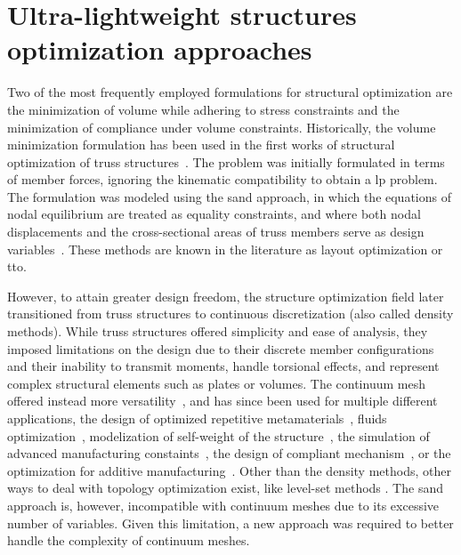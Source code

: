 \section{Ultra-lightweight structures optimization approaches}
Two of the most frequently employed formulations for structural optimization are the minimization of volume while adhering to stress constraints and the minimization of compliance under volume constraints. Historically, the volume minimization formulation has been used in the first works of structural optimization of truss structures~. The problem was initially formulated in terms of member forces, ignoring the kinematic compatibility to obtain a \gls{lp} problem. The formulation was modeled using the \gls{sand} approach, in which the equations of nodal equilibrium are treated as equality constraints, and where both nodal displacements and the cross-sectional areas of truss members serve as design variables~. These methods are known in the literature as layout optimization or \gls{tto}. 

However, to attain greater design freedom, the structure optimization field later transitioned from truss structures to continuous discretization (also called density methods). While truss structures offered simplicity and ease of analysis, they imposed limitations on the design due to their discrete member configurations and their inability to transmit moments, handle torsional effects, and represent complex structural elements such as plates or volumes. The continuum mesh offered instead more versatility~, and has since been used for multiple different applications, \eg the design of optimized repetitive metamaterials~, fluids optimization~, modelization of self-weight of the structure~, the simulation of advanced manufacturing constaints~, the design of compliant mechanism~, or the optimization for additive manufacturing~. Other than the density methods, other ways to deal with topology optimization exist, like level-set methods . The \gls{sand} approach is, however, incompatible with continuum meshes due to its excessive number of variables. Given this limitation, a new approach was required to better handle the complexity of continuum meshes.

